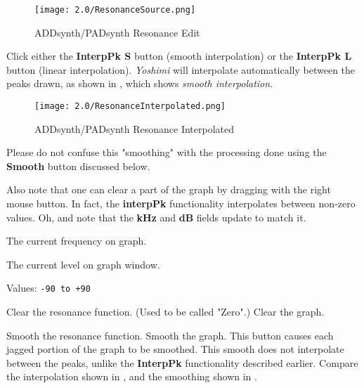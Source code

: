 \begin{figure}[H]
   \centering
   \texttt{[image: 2.0/ResonanceSource.png]}
   \caption{ADDsynth/PADsynth Resonance Edit}
   \label{fig:addsynth_resonance_edit}
\end{figure}

   Click either the \textbf{InterpPk S} button (smooth interpolation) or the \textbf{InterpPk L} button (linear interpolation). \textsl{Yoshimi} will interpolate automatically between the peaks drawn, as shown in , which shows
   \textsl{smooth interpolation}.

\begin{figure}[H]
   \centering
   \texttt{[image: 2.0/ResonanceInterpolated.png]}
   \caption{ADDsynth/PADsynth Resonance Interpolated}
   \label{fig:addsynth_resonance_interpolated}
\end{figure}


   Please do not confuse this "smoothing" with the processing done using the
   \textbf{Smooth} button discussed below.

   Also note that one can clear a part of the graph
   by dragging with the right mouse button. In fact, the \textbf{interpPk}
   functionality interpolates between non-zero values.
   Oh, and note that the \textbf{kHz} and \textbf{dB} fields update to match it.

   The current frequency on graph.

   The current level on graph window.

   Values: \texttt{-90 to +90}

   Clear the resonance function.  (Used to be called "Zero".)
   Clear the graph.

   Smooth the resonance function.
   Smooth the graph.
   This button causes each jagged portion of the graph to be smoothed.
   This smooth does not interpolate between the peaks, unlike the
   \textbf{InterpPk} functionality described earlier.  Compare the
   interpolation shown in ,
   and the smoothing shown in .

